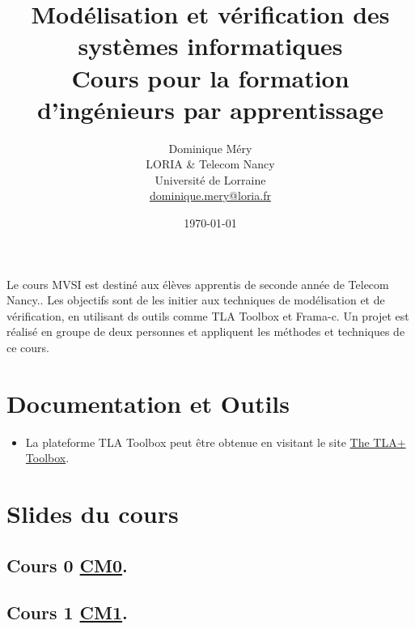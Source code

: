 \documentclass[ 12pt]{article}
\title{Modélisation et vérification des systèmes informatiques\\
Cours  pour la formation d'ingénieurs par apprentissage}
\author{Dominique M\'ery\\
LORIA \& Telecom Nancy\\ Universit\'e de Lorraine\\ \url{dominique.mery@loria.fr}}
\date{\today}
\begin{document}
\begin{tcolorbox}



  \setcounter{ex}{1}
\maketitle

Le cours MVSI  est destiné aux élèves apprentis de seconde année  de
Telecom Nancy..
Les objectifs sont de les initier aux techniques de modélisation et
de vérification, en utilisant ds outils comme TLA Toolbox et Frama-c.
Un projet est réalisé  en groupe de deux personnes et appliquent  les
méthodes  et techniques de ce cours.



  \tableofcontents

\section{Documentation et Outils}




\begin{itemize}

  
\item La plateforme TLA Toolbox peut être  obtenue en visitant le site  \href{https://lamport.azurewebsites.net/tla/toolbox.html}{The TLA+ Toolbox}.


  
\end{itemize}


\section{Slides du cours}
\label{sec:course-mcfsi-at}




\subsection{Cours 0
  \href{http://mery54.github.io/teaching/mvsi/lecturesnotes/lectures-app-2024-cm0.pdf}{CM0}. }




\subsection{Cours 1
  \href{http://mery54.github.io/teaching/mvsi/lecturesnotes/lectures-app-2024-cm1.pdf}{CM1}. }



\end{tcolorbox}
\end{document}
